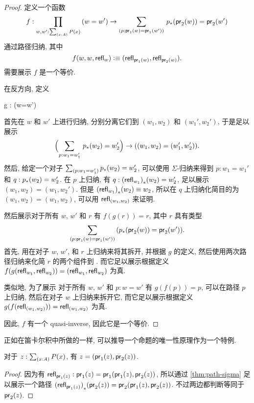 \begin{proof}
    定义一个函数
    \begin{equation*}
        f : \prd{w,w':\sm{x:A}P(x)} (w=w') \to \dsm{p:\proj{1}(w)=\proj{1}(w')} \trans{p}{\proj{2}(w)}=\proj{2}(w')
    \end{equation*}
    通过路径归纳, 其中
    \begin{equation*}
        f(w,w,\mathsf{refl}_{w})\vcentcolon\equiv(\mathsf{refl}_{\mathsf{pr}_{1}(w)},\mathsf{refl}_{\mathsf{pr}_{2}(w)}).
    \end{equation*}
    需要展示 $f$ 是一个等价.

    在反方向, 定义
    \begin{narrowmultline*}
        g : 
        \to
        \narrowbreak
        (w=w')
    \end{narrowmultline*}
    首先在 $w$ 和 $w'$ 上进行归纳, 分别分离它们到 $(w_1,w_2)$ 和 $(w_1',w_2')$, 于是足以展示
    \begin{equation*}
        \Parens{\sm{p:w_1 = w_1'}\trans{p}{w_2}=w_2'} \to ((w_1,w_2)=(w_1',w_2')).
    \end{equation*}
    然后, 给定一个对子 $\sm{p:w_1 = w_1'}\trans{p}{w_2}=w_2'$, 可以使用 $\Sigma$-归纳来得到 $p : w_1 = w_1'$ 和 $q : {p}_{*}\mathopen{}\left({w_2}\right)\mathclose{}=w_2'$.
    在 $p$ 上归纳, 有 $q : {(\mathsf{refl}_{w_1})}_{*}\mathopen{}\left({w_2}\right)\mathclose{}=w_2'$, 足以展示 $(w_1,w_2)=(w_1,w_2')$.
    但是 ${(\mathsf{refl}_{w_1})}_{*}\mathopen{}\left({w_2}\right)\mathclose{} \equiv w_2$, 所以在 $q$ 上归纳化简目的为 $(w_1,w_2)=(w_1,w_2)$, 可以用 $\mathsf{refl}_{(w_1,w_2)}$ 来证明.

    然后展示对于所有 $w$, $w'$ 和 $r$ 有 $f(g(r))=r$, 其中 $r$ 具有类型
    \[\dsm{p:\proj{1}(w)=\proj{1}(w')} (\trans{p}{\proj{2}(w)}=\proj{2}(w')).\]
    首先, 用在对子 $w$, $w'$, 和 $r$ 上归纳来将其拆开, 并根据 $g$ 的定义, 然后使用两次路径归纳来化简 $r$ 的两个组件到 .
    而它足以展示根据定义
    $f (g(\mathsf{refl}_{w_1},\mathsf{refl}_{w_2})) = (\mathsf{refl}_{w_1},\mathsf{refl}_{w_2})$ 为真.

    类似地, 为了展示 对于所有 $w$, $w'$ 和 $p : w = w'$ 有 $g(f(p))=p$, 可以在路径 $p$ 上归纳, 然后在对子 $w$ 上归纳来拆开它, 而它足以展示根据定义
    $g(f (\mathsf{refl}_{(w_1,w_2)})) = \mathsf{refl}_{(w_1,w_2)}$ 为真.

    因此, $f$ 有一个 quasi-inverse, 因此它是一个等价.
\end{proof}

正如在笛卡尔积中所做的一样, 可以推导一个命题的唯一性原理作为一个特例.

\begin{cor}
    \label{thm:eta-sigma}
    对于 $z:\sm{x:A} P(x)$, 有 $z = (\mathsf{pr}_{1}(z),\mathsf{pr}_{2}(z))$.
\end{cor}
\begin{proof}
    因为有 $\mathsf{refl}_{\mathsf{pr}_{1}(z)} : \mathsf{pr}_{1}(z) = \mathsf{pr}_{1}(\mathsf{pr}_{1}(z),\mathsf{pr}_{2}(z))$, 所以通过 \cref{thm:path-sigma} 足以展示一个路径 ${(\mathsf{refl}_{\mathsf{pr}_{1}(z)})}_{*}\mathopen{}\left({\mathsf{pr}_{2}(z)}\right)\mathclose{} = \mathsf{pr}_{2}(\mathsf{pr}_{1}(z),\mathsf{pr}_{2}(z))$.
    不过两边都判断等同于 $\mathsf{pr}_{2}(z)$.
\end{proof}


